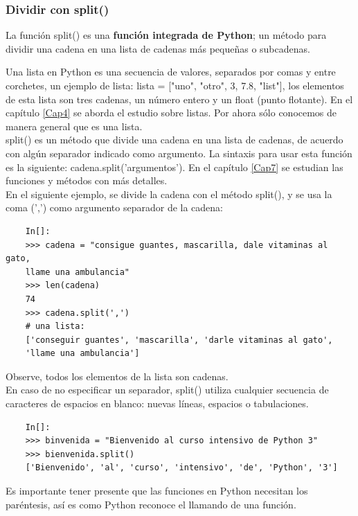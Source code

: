 \subsubsection{Dividir con split()}\label{cadena01}

La función {\ttfamily split()} es  una {\bf función integrada de Python}; un método para dividir una cadena en una lista de cadenas más pequeñas o subcadenas.  

Una lista en Python es una secuencia de valores, separados por comas y entre corchetes, un ejemplo de lista: {\ttfamily lista = ["{}uno", "{}otro", 3, 7.8, "{}list{}"{}]}, los elementos de esta lista son tres cadenas, un número entero y un float (punto flotante). En el capítulo \ref{Cap4} se aborda el estudio sobre  listas. Por ahora sólo conocemos de manera general que es una lista.\\

{\ttfamily split()} es un método que divide  una cadena en una lista de cadenas,  de acuerdo con algún separador indicado como argumento. La sintaxis para usar esta  función es la siguiente:  {\ttfamily cadena.split('argumentos')}. En el capítulo \ref{Cap7}  se estudian las funciones y métodos con más detalles.\\

En el siguiente ejemplo, se divide la cadena con el método {\ttfamily split()}, y se usa la coma (',') como argumento 
separador de la cadena:

\begin{lstlisting}
	In[]:	
	>>> cadena = "consigue guantes, mascarilla, dale vitaminas al gato,
	llame una ambulancia"
	>>> len(cadena) 
	74        
	>>> cadena.split(',')
	# una lista:
	['conseguir guantes', 'mascarilla', 'darle vitaminas al gato',
	'llame una ambulancia']
\end{lstlisting}

\noindent Observe, todos los elementos de la lista son cadenas.\\

En caso de no especificar un separador, {\ttfamily split()} utiliza cualquier secuencia de caracteres de espacios en blanco: nuevas líneas, espacios o tabulaciones.

\begin{lstlisting}
	In[]:
	>>> binvenida = "Bienvenido al curso intensivo de Python 3"	
	>>> bienvenida.split()
	['Bienvenido', 'al', 'curso', 'intensivo', 'de', 'Python', '3']
\end{lstlisting}

Es importante tener presente  que las funciones en Python  necesitan los paréntesis, así es como Python reconoce el llamando de una función.



